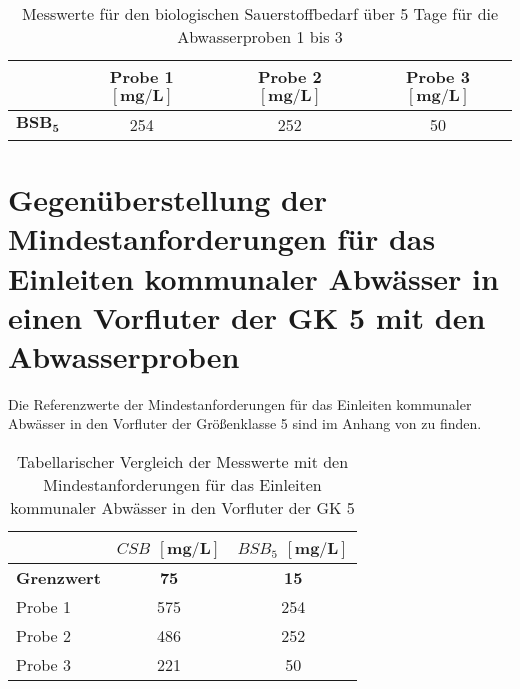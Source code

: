 \vspace*{-2.5mm}
\renewcommand{\arraystretch}{1.2}
\begin{table}[h!]
	\centering
	\caption{Messwerte für den biologischen Sauerstoffbedarf über 5 Tage für die Abwasserproben 1 bis 3}
	\label{tab:csb}
	\begin{tabulary}{1.7\textwidth}{L|C|C|C}
		\hline
		& \textbf{Probe 1 $\boldsymbol{\left[\si{\milli \gram \per \liter}\right]}$}& \textbf{Probe 2 $\boldsymbol{\left[\si{\milli \gram \per \liter}\right]}$} & \textbf{Probe 3 $\boldsymbol{\left[\si{\milli \gram \per \liter}\right]}$}  \\ 
		\hline
		\textbf{$\boldsymbol{BSB_5}$}& 254 & 252 & 50 \\
		\hline
	\end{tabulary}
\end{table}
\FloatBarrier


\newpage

\section{Gegenüberstellung der Mindestanforderungen für das Einleiten kommunaler Abwässer in einen Vorfluter der GK 5 mit den Abwasserproben}
Die Referenzwerte der Mindestanforderungen für das Einleiten kommunaler Abwässer in den Vorfluter der Größenklasse 5 sind im Anhang von \cite[S. 29]{Skript} zu finden.
\vspace*{-2.5mm}
\renewcommand{\arraystretch}{1.2}
\begin{table}[h!]
	\centering
	\caption{Tabellarischer Vergleich der Messwerte mit den Mindestanforderungen für das Einleiten kommunaler Abwässer in den Vorfluter der GK 5}
	\label{tab_vgl}
	\begin{tabulary}{1.2\textwidth}{l|C|C}
		\hline
		 & \textbf{$CSB$} $\boldsymbol{\left[\si{\milli\gram\per\liter}\right]}$ & \textbf{$BSB_5$} $\boldsymbol{\left[\si{\milli\gram\per\liter}\right]}$\\
		\hline
		\textbf{Grenzwert} & \textbf{75} & \textbf{15}  \\
		\hline
		Probe 1 & 575 & 254 \\
		Probe 2 & 486 & 252\\
		Probe 3 & 221 & 50\\
		\hline
	\end{tabulary}
\end{table}
\FloatBarrier

